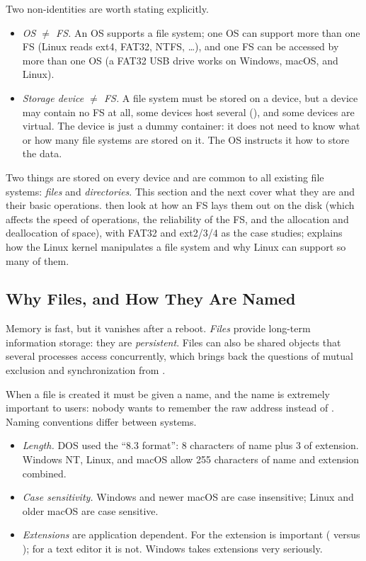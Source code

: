 Two non-identities are worth stating explicitly.
\begin{itemize}
  \item \emph{OS $\neq$ FS.} An OS supports a file system; one OS can support more than one FS (Linux reads ext4, FAT32, NTFS, \dots), and one FS can be accessed by more than one OS (a FAT32 USB drive works on Windows, macOS, and Linux).
  \item \emph{Storage device $\neq$ FS.} A file system must be stored on a device, but a device may contain no FS at all, some devices host several (), and some devices are virtual. The device is just a dummy container: it does not need to know what or how many file systems are stored on it. The OS instructs it how to store the data.
\end{itemize}

Two things are stored on every device and are common to all existing file systems: \emph{files} and \emph{directories}. This section and the next cover what they are and their basic operations.  then look at how an FS lays them out on the disk (which affects the speed of operations, the reliability of the FS, and the allocation and deallocation of space), with FAT32 and ext2/3/4 as the case studies;  explains how the Linux kernel manipulates a file system and why Linux can support so many of them.

\subsection{Why Files, and How They Are Named}

Memory is fast, but it vanishes after a reboot. \emph{Files} provide long-term information storage: they are \emph{persistent}. Files can also be shared objects that several processes access concurrently, which brings back the questions of mutual exclusion and synchronization from .

When a file is created it must be given a name, and the name is extremely important to users: nobody wants to remember the raw address  instead of . Naming conventions differ between systems.
\begin{itemize}
  \item \emph{Length.} DOS used the ``8.3 format'': 8 characters of name plus 3 of extension. Windows NT, Linux, and macOS allow 255 characters of name and extension combined.
  \item \emph{Case sensitivity.} Windows and newer macOS are case insensitive; Linux and older macOS are case sensitive.
  \item \emph{Extensions} are application dependent. For  the extension is important ( versus ); for a text editor it is not. Windows takes extensions very seriously.
\end{itemize}

